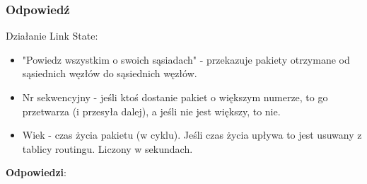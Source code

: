 		\subsubsection{Odpowiedź}
			Działanie Link State:
			\begin{itemize}
				\item "Powiedz wszystkim o swoich sąsiadach" - przekazuje pakiety otrzymane od sąsiednich węzłów do sąsiednich węzłów.
				\item Nr sekwencyjny - jeśli ktoś dostanie pakiet o większym numerze, to go przetwarza (i przesyła dalej), a jeśli nie jest większy, to nie.
				\item Wiek - czas życia pakietu (w cyklu). Jeśli czas życia upływa to jest usuwany z tablicy routingu. Liczony w sekundach.
			\end{itemize}
			\textbf{Odpowiedzi}:
